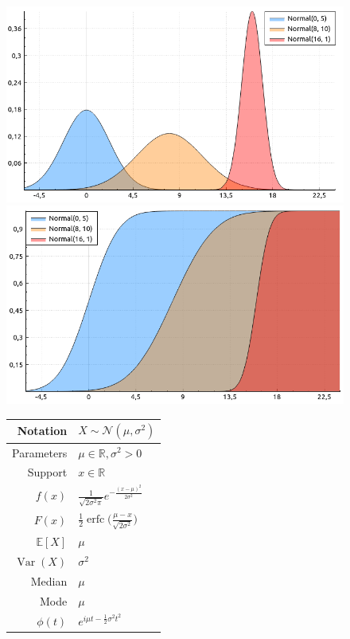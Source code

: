 \documentclass[a4paper,11pt]{article}
\theoremstyle{plain}
\theoremstyle{definition}
\newcommand{\ME}{\mathbb{E}}
\newcommand{\MR}{\mathbb{R}}
\newcommand{\Var}{\operatorname{Var}}
\begin{document}
\begin{figure}[!htb]\centering
	\begin{minipage}{0.55\textwidth}
		\includegraphics[width=\linewidth, right]{normal_pdf}
		\captionsetup{labelformat=empty}
		\includegraphics[width=\linewidth, right]{normal_cdf}
		\captionsetup{labelformat=empty}
	\end{minipage}
	\begin{minipage}{0.4\textwidth}
		\begin{tabular}{| r | l |}
			\hline
			Notation & $X \sim \mathcal{N}(\mu, \sigma^2)$ \\
			\hline
			Parameters & $\mu \in \MR, \sigma^2 > 0 $ \\
			\hline
			Support & $x \in \MR$  \\
			\hline
			$f(x)$ & $ \frac{1}{\sqrt{2\sigma^2\pi}}e^{-\frac{(x-\mu)^2}{2\sigma^2}}  $ \\
			\hline
			$F(x)$ & $ \frac{1}{2} \operatorname{erfc}\Big( \frac{\mu-x}{\sqrt{2\sigma^2}} \Big) $ \\
			\hline
			$\ME[X]$ & $ \mu$ \\
			\hline
			$\Var(X)$ & $\sigma^2$\\
			\hline
			Median & $\mu$ \\
			\hline
			Mode & $\mu$ \\
			\hline
			$\phi(t)$ & $ e^{i\mu t - \frac{1}{2}\sigma^2t^2}  $ \\
			\hline
		\end{tabular}
	\end{minipage}
\end{figure}
\end{document}
